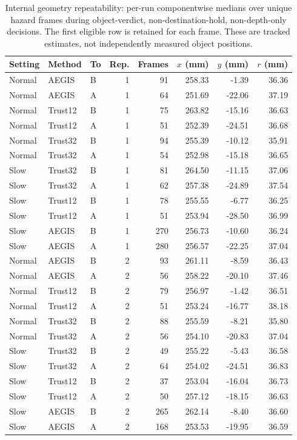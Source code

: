 \begin{table}[H]
\centering
\footnotesize
\caption{Internal geometry repeatability: per-run componentwise medians over unique hazard frames during object-verdict, non-destination-hold, non-depth-only decisions. The first eligible row is retained for each frame. These are tracked estimates, not independently measured object positions.}
\label{tab:geometry-repeatability}
\begin{tabular}{lllrrrrr}
\toprule
Setting & Method & To & Rep. & Frames & $x$ (mm) & $y$ (mm) & $r$ (mm) \\
\midrule
Normal & AEGIS & B & 1 & 91 & 258.33 & -1.39 & 36.36 \\
Normal & AEGIS & A & 1 & 64 & 251.69 & -22.06 & 37.19 \\
Normal & Trust12 & B & 1 & 75 & 263.82 & -15.16 & 36.63 \\
Normal & Trust12 & A & 1 & 51 & 252.39 & -24.51 & 36.68 \\
Normal & Trust32 & B & 1 & 94 & 255.39 & -10.12 & 35.91 \\
Normal & Trust32 & A & 1 & 54 & 252.98 & -15.18 & 36.65 \\
Slow & Trust32 & B & 1 & 81 & 264.50 & -11.15 & 37.06 \\
Slow & Trust32 & A & 1 & 62 & 257.38 & -24.89 & 37.54 \\
Slow & Trust12 & B & 1 & 78 & 255.55 & -6.77 & 36.25 \\
Slow & Trust12 & A & 1 & 51 & 253.94 & -28.50 & 36.99 \\
Slow & AEGIS & B & 1 & 270 & 256.73 & -10.60 & 36.24 \\
Slow & AEGIS & A & 1 & 280 & 256.57 & -22.25 & 37.04 \\
Normal & AEGIS & B & 2 & 93 & 261.11 & -8.59 & 36.43 \\
Normal & AEGIS & A & 2 & 56 & 258.22 & -20.10 & 37.46 \\
Normal & Trust12 & B & 2 & 79 & 256.97 & -1.42 & 36.51 \\
Normal & Trust12 & A & 2 & 51 & 253.24 & -16.77 & 38.18 \\
Normal & Trust32 & B & 2 & 88 & 255.59 & -8.21 & 35.80 \\
Normal & Trust32 & A & 2 & 56 & 254.10 & -20.83 & 37.04 \\
Slow & Trust32 & B & 2 & 49 & 255.22 & -5.43 & 36.58 \\
Slow & Trust32 & A & 2 & 64 & 254.02 & -24.51 & 36.83 \\
Slow & Trust12 & B & 2 & 37 & 253.04 & -16.04 & 36.73 \\
Slow & Trust12 & A & 2 & 50 & 257.12 & -18.15 & 36.63 \\
Slow & AEGIS & B & 2 & 265 & 262.14 & -8.40 & 36.60 \\
Slow & AEGIS & A & 2 & 168 & 253.53 & -19.95 & 36.59 \\
\bottomrule
\end{tabular}
\end{table}
